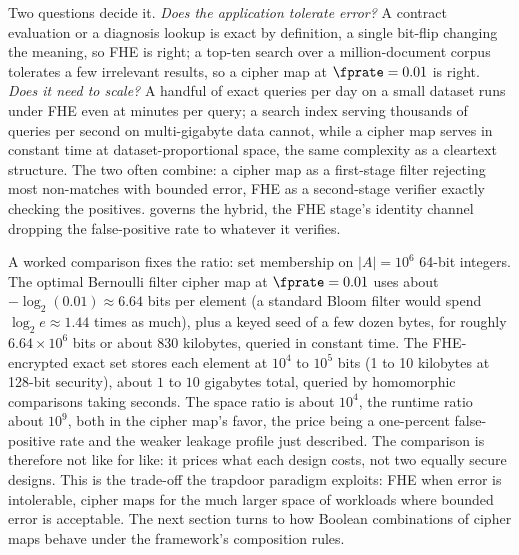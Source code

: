 Two questions decide it. \emph{Does the application tolerate error?} A
contract evaluation or a diagnosis lookup is exact by definition, a
single bit-flip changing the meaning, so FHE is right; a top-ten search
over a million-document corpus tolerates a few irrelevant results, so a
cipher map at $\fprate = 0.01$ is right. \emph{Does it need to scale?} A
handful of exact queries per day on a small dataset runs under FHE even
at minutes per query; a search index serving thousands of queries per
second on multi-gigabyte data cannot, while a cipher map serves in
constant time at dataset-proportional space, the same complexity as a
cleartext structure. The two often combine: a cipher map as a first-stage
filter rejecting most non-matches with bounded error, FHE as a
second-stage verifier exactly checking the positives.
 governs the hybrid, the FHE stage's
identity channel dropping the false-positive rate to whatever it
verifies.

A worked comparison fixes the ratio: set membership on $|A| = 10^6$
64-bit integers. The optimal Bernoulli filter cipher map at $\fprate =
0.01$ uses about $-\log_2(0.01) \approx 6.64$ bits per element (a
standard Bloom filter would spend $\log_2 e \approx 1.44$ times as much),
plus a keyed seed of a few dozen bytes, for roughly $6.64 \times 10^6$
bits or about $830$ kilobytes, queried in constant time. The FHE-encrypted
exact set stores each element at $10^4$ to $10^5$ bits (1 to 10 kilobytes
at 128-bit security), about $1$ to $10$ gigabytes total, queried by
homomorphic comparisons taking seconds. The space ratio is about $10^4$,
the runtime ratio about $10^9$, both in the cipher map's favor, the price
being a one-percent false-positive rate and the weaker leakage profile
just described. The comparison is therefore not like for like: it prices
what each design costs, not two equally secure designs. This is the trade-off the
trapdoor paradigm exploits: FHE when error is intolerable, cipher maps
for the much larger space of workloads where bounded error is acceptable.
The next section turns to how Boolean combinations of cipher maps behave
under the framework's composition rules.
